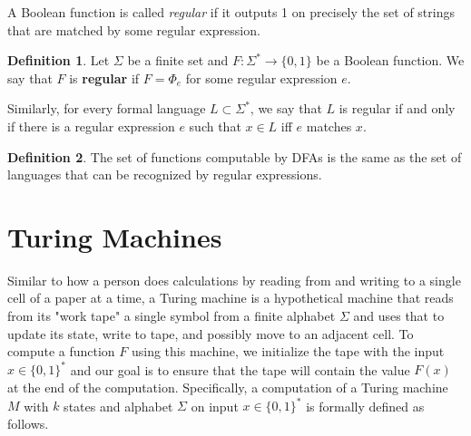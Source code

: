 \documentclass[a4paper, 12pt]{report}
\theoremstyle{remark}
\theoremstyle{definition}
\newtheorem{definition}{Definition}[section]
\begin{document}
A Boolean function is called \textit{regular} if it outputs 1 on precisely the set of strings that are matched by some regular expression. 

\begin{definition}
Let $\Sigma$ be a finite set and $F: \Sigma^* \longrightarrow \{0,1\}$ be a Boolean function. We say that $F$ is \textbf{regular} if $F = \Phi_e$ for some regular expression $e$. 

Similarly, for every formal language $L \subset \Sigma^*$, we say that $L$ is regular if and only if there is a regular expression $e$ such that $x \in L$ iff $e$ matches $x$. 
\end{definition}

\begin{definition}
The set of functions computable by DFAs is the same as the set of languages that can be recognized by regular expressions. 
\end{definition}

\section{Turing Machines}

Similar to how a person does calculations by reading from and writing to a single cell of a paper at a time, a Turing machine is a hypothetical machine that reads from its "work tape" a single symbol from a finite alphabet $\Sigma$ and uses that to update its state, write to tape, and possibly move to an adjacent cell. To compute a function $F$ using this machine, we initialize the tape with the input $x \in \{0,1\}^*$ and our goal is to ensure that the tape will contain the value $F(x)$ at the end of the computation. Specifically, a computation of a Turing machine $M$ with $k$ states and alphabet $\Sigma$ on input $x \in \{0,1\}^*$ is formally defined as follows. 
\end{document}
